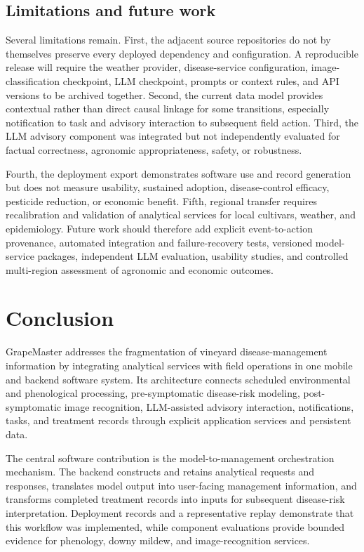 \documentclass[12pt]{article}
\begin{document}
\subsection{Limitations and future work}\label{limitations-and-future-directions}

Several limitations remain. First, the adjacent source repositories do not by themselves preserve every deployed dependency and configuration. A reproducible release will require the weather provider, disease-service configuration, image-classification checkpoint, LLM checkpoint, prompts or context rules, and API versions to be archived together. Second, the current data model provides contextual rather than direct causal linkage for some transitions, especially notification to task and advisory interaction to subsequent field action. Third, the LLM advisory component was integrated but not independently evaluated for factual correctness, agronomic appropriateness, safety, or robustness.

Fourth, the deployment export demonstrates software use and record generation but does not measure usability, sustained adoption, disease-control efficacy, pesticide reduction, or economic benefit. Fifth, regional transfer requires recalibration and validation of analytical services for local cultivars, weather, and epidemiology. Future work should therefore add explicit event-to-action provenance, automated integration and failure-recovery tests, versioned model-service packages, independent LLM evaluation, usability studies, and controlled multi-region assessment of agronomic and economic outcomes.

\section{Conclusion}\label{conclusion}

GrapeMaster addresses the fragmentation of vineyard disease-management information by integrating analytical services with field operations in one mobile and backend software system. Its architecture connects scheduled environmental and phenological processing, pre-symptomatic disease-risk modeling, post-symptomatic image recognition, LLM-assisted advisory interaction, notifications, tasks, and treatment records through explicit application services and persistent data.

The central software contribution is the model-to-management orchestration mechanism. The backend constructs and retains analytical requests and responses, translates model output into user-facing management information, and transforms completed treatment records into inputs for subsequent disease-risk interpretation. Deployment records and a representative replay demonstrate that this workflow was implemented, while component evaluations provide bounded evidence for phenology, downy mildew, and image-recognition services.
\end{document}

